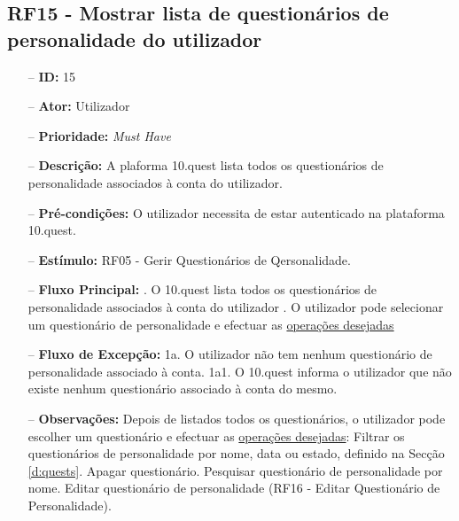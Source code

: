 \subsection{RF15 - Mostrar lista de questionários de personalidade do utilizador}
\begin{itemize}
	\item[--] \textbf{ID:} 15
	\item[--]  \textbf{Ator:} Utilizador
	\item[--]  \textbf{Prioridade:} \textit{Must Have}
	\item[--]  \textbf{Descrição:} A plaforma 10.quest lista todos os questionários de personalidade associados à conta do utilizador.
	\item[--]  \textbf{Pré-condições:} O utilizador necessita de estar autenticado na plataforma 10.quest.
	\item[--]  \textbf{Estímulo:} RF05 - Gerir Questionários de Qersonalidade.
	\item[--]  \textbf{Fluxo Principal:} 
		. O 10.quest lista todos os questionários de personalidade associados à conta do utilizador
		. O utilizador pode selecionar um questionário de personalidade e efectuar as \underline{operações desejadas}
	\item[--]  \textbf{Fluxo de Excepção:} 
		\subitem 1a. O utilizador não tem nenhum questionário de personalidade associado à conta.
		\subitem 1a1. O 10.quest informa o utilizador que não existe nenhum questionário associado à conta do mesmo.
	\item[--]  \textbf{Observações:} Depois de listados todos os questionários, o utilizador pode escolher um questionário e efectuar as \underline{operações desejadas}:
		\subitem Filtrar os questionários de personalidade por nome, data ou estado, definido na Secção \ref{d:quests}.
		\subitem Apagar questionário.
		\subitem Pesquisar questionário de personalidade por nome.
		\subitem Editar questionário de personalidade (RF16 - Editar Questionário de Personalidade).
\end{itemize}
\newpage


